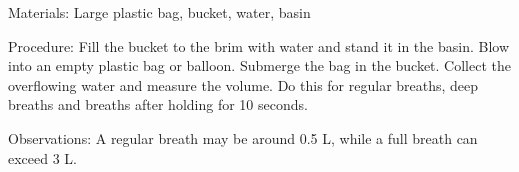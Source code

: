 \begin{multicols}{2}
\begin{description*}
\item[Materials:]{Large plastic bag, bucket, water, basin}
\item[Procedure:]{Fill the bucket to the brim with water and stand it in the basin. Blow
into an empty plastic bag or balloon. Submerge the bag in the bucket. Collect the
overflowing water and measure the volume. Do this for regular breaths, deep breaths and breaths after holding for 10 seconds.}
\item[Observations:]{A regular breath may be around 0.5 L, while a full breath can exceed 3 L.}
\end{description*}

%
%


\end{multicols}
